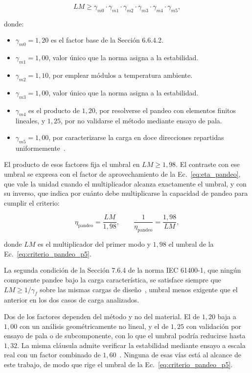 \begin{equation}
    LM \geq \gamma_{m0} \cdot \gamma_{m1} \cdot \gamma_{m2} \cdot \gamma_{m3} \cdot \gamma_{m4} \cdot \gamma_{m5},
    \label{eq:criterio_pandeo_p5}
\end{equation}

donde:
\begin{itemize}
    \item $\gamma_{m0} = 1{,}20$ es el factor base de la Sección 6.6.4.2.
    \item $\gamma_{m1} = 1{,}00$, valor único que la norma asigna a la estabilidad.
    \item $\gamma_{m2} = 1{,}10$, por emplear módulos a temperatura ambiente.
    \item $\gamma_{m3} = 1{,}00$, valor único que la norma asigna a la estabilidad.
    \item $\gamma_{m4}$ es el producto de $1{,}20$, por resolverse el pandeo con elementos finitos lineales, y $1{,}25$, por no validarse el método mediante ensayo de pala.
    \item $\gamma_{m5} = 1{,}00$, por caracterizarse la carga en doce direcciones repartidas uniformemente~\parencite{IEC61400-5}.
\end{itemize}

El producto de esos factores fija el umbral en $LM \geq 1{,}98$. El contraste con ese umbral se expresa con el factor de aprovechamiento de la Ec.~\ref{eq:eta_pandeo}, que vale la unidad cuando el multiplicador alcanza exactamente el umbral, y con su inverso, que indica por cuánto debe multiplicarse la capacidad de pandeo para cumplir el criterio:

\begin{equation}
    \eta_{\text{pandeo}} = \frac{LM}{1{,}98}, \qquad \frac{1}{\eta_{\text{pandeo}}} = \frac{1{,}98}{LM},
    \label{eq:eta_pandeo}
\end{equation}

donde $LM$ es el multiplicador del primer modo y $1{,}98$ el umbral de la Ec.~\ref{eq:criterio_pandeo_p5}.

La segunda condición de la Sección 7.6.4 de la norma IEC 61400-1, que ningún componente pandee bajo la carga característica, se satisface siempre que $LM \geq 1 / \gamma_f$ sobre las mismas cargas de diseño~\parencite*{IEC61400-1}, umbral menos exigente que el anterior en los dos casos de carga analizados.

Dos de los factores dependen del método y no del material. El de $1{,}20$ baja a $1{,}00$ con un análisis geométricamente no lineal, y el de $1{,}25$ con validación por ensayo de pala o de subcomponente, con lo que el umbral podría reducirse hasta $1{,}32$. La misma cláusula admite verificar la estabilidad mediante ensayo a escala real con un factor combinado de $1{,}60$~\parencite{IEC61400-5}. Ninguna de esas vías está al alcance de este trabajo, de modo que rige el umbral de la Ec.~\ref{eq:criterio_pandeo_p5}.

